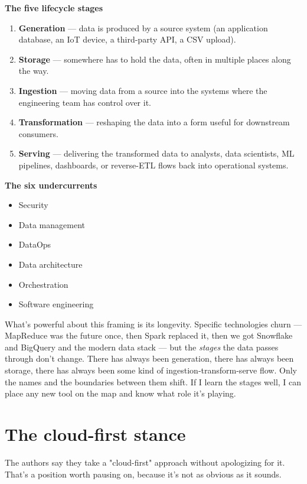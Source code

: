 \begin{defbox}
\textbf{The five lifecycle stages}
\begin{enumerate}[leftmargin=*]
  \item \textbf{Generation} — data is produced by a source system (an application database, an IoT device, a third-party API, a CSV upload).
  \item \textbf{Storage} — somewhere has to hold the data, often in multiple places along the way.
  \item \textbf{Ingestion} — moving data from a source into the systems where the engineering team has control over it.
  \item \textbf{Transformation} — reshaping the data into a form useful for downstream consumers.
  \item \textbf{Serving} — delivering the transformed data to analysts, data scientists, ML pipelines, dashboards, or reverse-ETL flows back into operational systems.
\end{enumerate}

\textbf{The six undercurrents}
\begin{itemize}[leftmargin=*]
  \item Security
  \item Data management
  \item DataOps
  \item Data architecture
  \item Orchestration
  \item Software engineering
\end{itemize}
\end{defbox}

What's powerful about this framing is its longevity. Specific technologies churn — MapReduce was the future once, then Spark replaced it, then we got Snowflake and BigQuery and the modern data stack — but the \emph{stages} the data passes through don't change. There has always been generation, there has always been storage, there has always been some kind of ingestion-transform-serve flow. Only the names and the boundaries between them shift. If I learn the stages well, I can place any new tool on the map and know what role it's playing.

\section*{The cloud-first stance}

The authors say they take a "cloud-first" approach without apologizing for it. That's a position worth pausing on, because it's not as obvious as it sounds.

